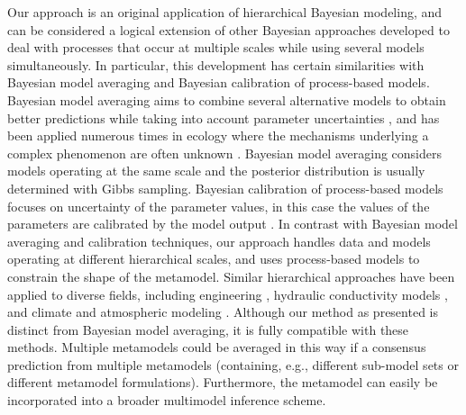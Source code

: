 \documentclass[11pt]{article}
\begin{document}
Our approach is an original application of hierarchical Bayesian modeling, and can be considered a logical extension of other Bayesian approaches developed to deal with processes that occur at multiple scales while using several models simultaneously. 
In particular, this development has certain similarities with Bayesian model averaging and Bayesian calibration of process-based models. 
Bayesian model averaging aims to combine several alternative models to obtain better predictions while taking into account parameter uncertainties \citep{Hoeting1999}, and has been applied numerous times in ecology where the mechanisms underlying a complex phenomenon are often unknown \citep[e.g.,][]{Wintle2003, Link2006}. 
Bayesian model averaging considers models operating at the same scale and the posterior distribution is usually determined with Gibbs sampling. 
Bayesian calibration of process-based models focuses on uncertainty of the parameter values, in this case the values of the parameters are calibrated by the model output \citep{VanOijen2005, Hartig2012}. 
In contrast with Bayesian model averaging and calibration techniques, our approach handles data and models operating at different hierarchical scales, and uses process-based models to constrain the shape of the metamodel.
Similar hierarchical approaches have been applied to diverse fields, including engineering \citep{Booth2013}, hydraulic conductivity models \citep{Dostert2009, Efendiev2005}, and climate and atmospheric modeling \citep{Mcmillan2010, Kang2012}.
Although our method as presented is distinct from Bayesian model averaging, it is fully compatible with these methods.
Multiple metamodels could be averaged in this way if a consensus prediction from multiple metamodels (containing, e.g., different sub-model sets or different metamodel formulations).
Furthermore, the metamodel can easily be incorporated into a broader multimodel inference scheme.

\end{document}
